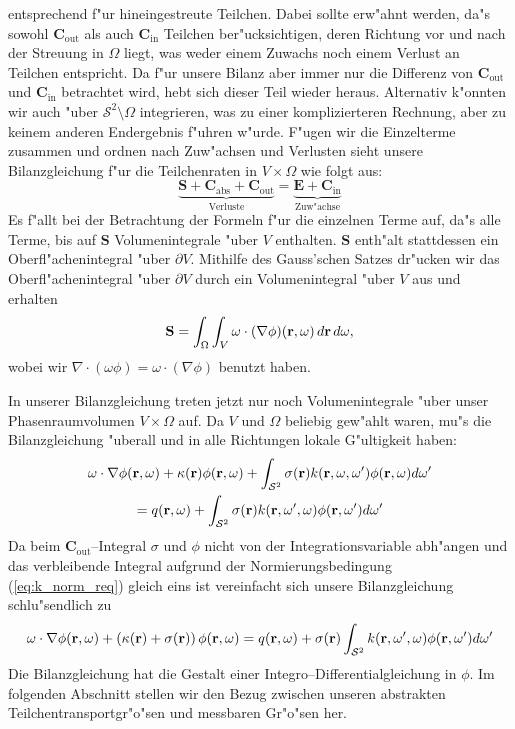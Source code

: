 	entsprechend f"ur hineingestreute Teilchen. Dabei sollte erw"ahnt werden, da"s sowohl $\mathbf{C}_\text{out}$ als auch $\mathbf{C}_\text{in}$ Teilchen ber"ucksichtigen, deren Richtung vor und nach der Streuung in $\Omega$ liegt, was weder einem Zuwachs noch einem Verlust an Teilchen entspricht. Da f"ur unsere Bilanz aber immer nur die Differenz von $\mathbf{C}_\text{out}$ und $\mathbf{C}_\text{in}$ betrachtet wird, hebt sich dieser Teil wieder heraus. Alternativ k"onnten wir auch "uber $\mathcal{S}^2 \setminus \Omega$ integrieren, was zu einer komplizierteren Rechnung, aber zu keinem anderen Endergebnis f"uhren w"urde. F"ugen wir die Einzelterme zusammen und ordnen nach Zuw"achsen und Verlusten sieht unsere Bilanzgleichung f"ur die Teilchenraten in $V \times \Omega$ wie folgt aus:
	$$\underbrace{\mathbf{S}+\mathbf{C}_\text{abs}+\mathbf{C}_\text{out}}_\text{Verluste}=\underbrace{\mathbf{E}+\mathbf{C}_\text{in}}_\text{Zuw"achse}$$
	Es f"allt bei der Betrachtung der Formeln f"ur die einzelnen Terme auf, da"s alle Terme, bis auf $\mathbf{S}$ Volumenintegrale "uber $V$ enthalten. $\mathbf{S}$ enth"alt stattdessen ein Oberfl"achenintegral "uber $\partial V$. Mithilfe des Gauss'schen Satzes dr"ucken wir das Oberfl"achenintegral "uber $\partial V$ durch ein Volumenintegral "uber $V$ aus und erhalten
	$$\mathbf{S}=\int_\Omega \int_V \omega \cdot (\nabla\phi)(\mathbf{r},\omega)\,d\mathbf{r}\,d\omega,$$
	wobei wir $\nabla \cdot(\omega\phi)=\omega\cdot(\nabla\phi)$ benutzt haben.
	
	In unserer Bilanzgleichung treten jetzt nur noch Volumenintegrale "uber unser Phasenraumvolumen $V \times \Omega$ auf. Da $V$ und $\Omega$ beliebig gew"ahlt waren, mu"s die Bilanzgleichung "uberall und in alle Richtungen lokale G"ultigkeit haben:
	\begin{multline*}
	  \omega\cdot\nabla\phi(\mathbf{r},\omega)+\kappa(\mathbf{r})\phi(\mathbf{r},\omega)+\int_{\mathcal{S}^2}\sigma(\mathbf{r})k(\mathbf{r},\omega,\omega')\phi(\mathbf{r},\omega)d\omega' \\
	  =q(\mathbf{r},\omega)+\int_{\mathcal{S}^2}\sigma(\mathbf{r})k(\mathbf{r},\omega',\omega)\phi(\mathbf{r},\omega')d\omega'
	\end{multline*}
	Da beim $\mathbf{C}_\text{out}$--Integral $\sigma$ und $\phi$ nicht von der Integrationsvariable abh"angen und das verbleibende Integral aufgrund der Normierungsbedingung (\ref{eq:k_norm_req}) gleich eins ist vereinfacht sich unsere Bilanzgleichung schlu"sendlich zu
	\begin{equation}\label{eq:particle_balance_equation}
	  \omega\cdot\nabla\phi(\mathbf{r},\omega)+\left(\kappa(\mathbf{r})+\sigma(\mathbf{r})\right)\phi(\mathbf{r},\omega)
	  =q(\mathbf{r},\omega)+\sigma(\mathbf{r})\int_{\mathcal{S}^2}k(\mathbf{r},\omega',\omega)\phi(\mathbf{r},\omega')d\omega'
	\end{equation}
	Die Bilanzgleichung hat die Gestalt einer Integro--Differentialgleichung in $\phi$.
	Im folgenden Abschnitt stellen wir den Bezug zwischen unseren abstrakten Teilchentransportgr"o"sen und messbaren Gr"o"sen her.

